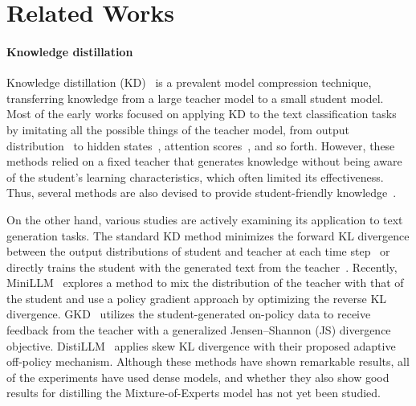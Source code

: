 \section{Related Works}
\paragraph{Knowledge distillation}
Knowledge distillation (KD)~\citep{hinton2015distilling} is a prevalent model compression technique, transferring knowledge from a large teacher model to a small student model.
Most of the early works focused on applying KD to the text classification tasks by imitating all the possible things of the teacher model, from output distribution~\citep{song2020lightpaff, liang2020mixkd} to hidden states~\citep{jiao2020tinybert, sun2019patient, park-etal-2021-distilling}, attention scores~\citep{wang2020minilm}, and so forth.
However, these methods relied on a fixed teacher that generates knowledge without being aware of the student’s learning characteristics, which often limited its effectiveness.
Thus, several methods are also devised to provide student-friendly knowledge~\citep{park2021learning, zhou2022bert, ren-etal-2023-tailoring}.

On the other hand, various studies are actively examining its application to text generation tasks.
The standard KD method minimizes the forward KL divergence between the output distributions of student and teacher at each time step~\citep{sanh2019distilbert} or directly trains the student with the generated text from the teacher~\citep{kim2016sequence, taori2023stanford, chiang2023vicuna, peng2023instruction}.
Recently, MiniLLM~\citep{gu2024minillm} explores a method to mix the distribution of the teacher with that of the student and use a policy gradient approach by optimizing the reverse KL divergence.
GKD~\citep{agarwal2024generalized} utilizes the student-generated on-policy data to receive feedback from the teacher with a generalized Jensen–Shannon (JS) divergence objective.
DistiLLM~\citep{ko2024distillm} applies skew KL divergence with their proposed adaptive off-policy mechanism.
Although these methods have shown remarkable results, all of the experiments have used dense models, and whether they also show good results for distilling the Mixture-of-Experts model has not yet been studied.


